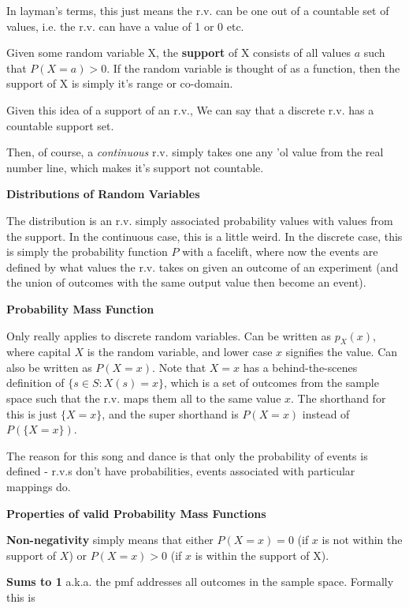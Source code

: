 \documentclass{article}
\begin{document}
			In layman's terms, this just means the r.v. can be one out of a countable set of values, i.e. the r.v. can have a value of 1 or 0 etc.
			
			Given some random variable X, the \textbf{support} of X consists of all values $a$ such that $P(X = a) > 0$. If the random variable is thought of as a function, then the support of X is simply it's range or co-domain.
			
			Given this idea of a support of an r.v., We can say that a discrete r.v. has a countable support set.
			
			Then, of course, a \textit{continuous} r.v. simply takes one any 'ol value from the real number line, which makes it's support not countable.
			
		\textbf{Distributions of Random Variables}
		
			The distribution is an r.v. simply associated probability values with values from the support. In the continuous case, this is a little weird. In the discrete case, this is simply the probability function $P$ with a facelift, where now the events are defined by what values the r.v. takes on given an outcome of an experiment (and the union of outcomes with the same output value then become an event).
			
		\textbf{Probability Mass Function}
			
			Only really applies to discrete random variables. Can be written as $p_X(x)$, where capital $X$ is the random variable, and lower case $x$ signifies the value. Can also be written as $P(X = x)$. Note that $X = x$ has a behind-the-scenes definition of $\{s \in S: X(s) = x\}$, which is a set of outcomes from the sample space such that the r.v. maps them all to the same value $x$. The shorthand for this is just $\{X = x\}$, and the super shorthand is $P(X = x)$ instead of $P(\{X = x\})$.
			
			The reason for this song and dance is that only the probability of events is defined - r.v.s don't have probabilities, events associated with particular mappings do.
			
		\textbf{Properties of valid Probability Mass Functions}
		
			\textbf{Non-negativity} simply means that either $P(X = x) = 0$ (if $x$ is not within the support of $X$) or $P(X = x) > 0$ (if $x$ is within the support of X).
			
			\textbf{Sums to 1} a.k.a. the pmf addresses all outcomes in the sample space. Formally this is
			
\end{document}
